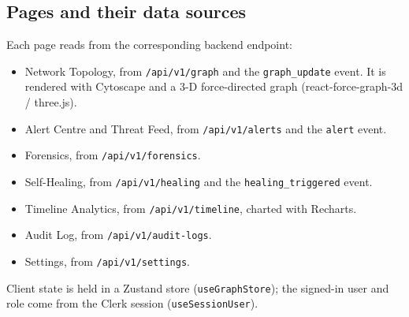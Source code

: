 \documentclass[12pt,a4paper]{report}
\begin{document}
\subsection{Pages and their data sources}
Each page reads from the corresponding backend endpoint:
\begin{itemize}
    \item Network Topology, from \texttt{/api/v1/graph} and the \texttt{graph\_update} event. It is rendered with Cytoscape and a 3-D force-directed graph (react-force-graph-3d / three.js).
    \item Alert Centre and Threat Feed, from \texttt{/api/v1/alerts} and the \texttt{alert} event.
    \item Forensics, from \texttt{/api/v1/forensics}.
    \item Self-Healing, from \texttt{/api/v1/healing} and the \texttt{healing\_triggered} event.
    \item Timeline Analytics, from \texttt{/api/v1/timeline}, charted with Recharts.
    \item Audit Log, from \texttt{/api/v1/audit-logs}.
    \item Settings, from \texttt{/api/v1/settings}.
\end{itemize}
Client state is held in a Zustand store (\texttt{useGraphStore}); the signed-in user and role come from the Clerk session (\texttt{useSessionUser}).
\end{document}
